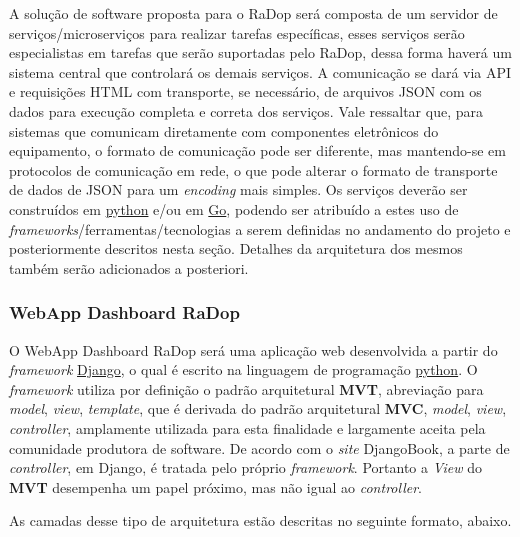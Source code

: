 A solução de software proposta para o RaDop será composta de um servidor
de serviços/microserviços para realizar tarefas específicas, esses
serviços serão especialistas em tarefas que serão suportadas pelo RaDop,
dessa forma haverá um sistema central que controlará os demais serviços.
A comunicação se dará via API e requisições HTML com transporte, se
necessário, de arquivos JSON com os dados para execução completa e
correta dos serviços. Vale ressaltar que, para sistemas que comunicam
diretamente com componentes eletrônicos do equipamento, o formato de
comunicação pode ser diferente, mas mantendo-se em protocolos de
comunicação em rede, o que pode alterar o formato de transporte de dados
de JSON para um \emph{encoding} mais simples. Os serviços deverão ser
construídos em \href{https://www.python.org/}{python} e/ou em
\href{https://golang.org/}{Go}, podendo ser atribuído a estes uso de
\emph{frameworks}/ferramentas/tecnologias a serem definidas no andamento
do projeto e posteriormente descritos nesta seção. Detalhes da
arquitetura dos mesmos também serão adicionados a posteriori.

\subsubsection{WebApp Dashboard RaDop}\label{webapp-dashboard-radop}

O WebApp Dashboard RaDop será uma aplicação web desenvolvida a partir do
\emph{framework} \href{https://www.djangoproject.com/}{Django}, o qual é
escrito na linguagem de programação
\href{https://www.python.org/}{python}. O \emph{framework} utiliza por
definição o padrão arquitetural \textbf{MVT}, abreviação para
\emph{model}, \emph{view}, \emph{template}, que é derivada do padrão
arquitetural \textbf{MVC}, \emph{model}, \emph{view}, \emph{controller},
amplamente utilizada para esta finalidade e largamente aceita pela
comunidade produtora de software. De acordo com o \emph{site}
DjangoBook, a parte de \emph{controller}, em Django, é tratada pelo
próprio \emph{framework}. Portanto a \emph{View} do \textbf{MVT}
desempenha um papel próximo, mas não igual ao \emph{controller}.

As camadas desse tipo de arquitetura estão descritas no seguinte
formato, abaixo.

